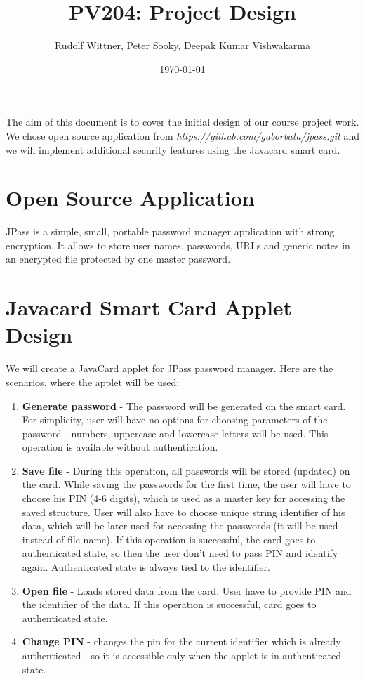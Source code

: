 \documentclass[11pt,a4paper]{article}
\begin{document}
\title{PV204: Project Design}
\author{ Rudolf Wittner, Peter Sooky, Deepak Kumar Vishwakarma}
\date{\today}
\maketitle
\abstract
The aim of this document is to  cover the initial design of our course project work. We chose open source application from \emph{https://github.com/gaborbata/jpass.git} and we will implement additional security features using the Javacard smart card.

\section{Open Source Application}
JPass is a simple, small, portable password manager application with strong encryption. It allows to store user names, passwords, URLs and generic notes in an encrypted file protected by one master password.

\section{Javacard  Smart Card Applet Design}
We will create a JavaCard applet for JPass password manager. Here are the scenarios, where the applet will be used:
\begin{enumerate}[-]
\item \textbf{Generate password} - The password will be generated on the smart card. For simplicity, user will have no options for choosing parameters of the password - numbers, uppercase and lowercase letters will be used. This operation is available without authentication.
\item \textbf{Save file} -  During this operation, all passwords will be stored (updated) on the card. While saving the passwords for the first time, the user will have to choose his PIN (4-6 digits), which is used as a master key for accessing the saved structure. User will also have to choose unique string identifier of his data, which will be later used for accessing the passwords (it will be used instead of file name). If this operation is successful, the card goes to authenticated state, so then the user don't need to pass PIN and identify again. Authenticated state is always tied to the identifier.
\item \textbf{Open file} - Loads stored data from the card. User have to provide PIN and the identifier of the data. If this operation is successful, card goes to authenticated state.
\item \textbf{Change PIN} - changes the pin for the current identifier which is already authenticated - so it is accessible only when the applet is in authenticated state.
\end{enumerate}
\end{document}
